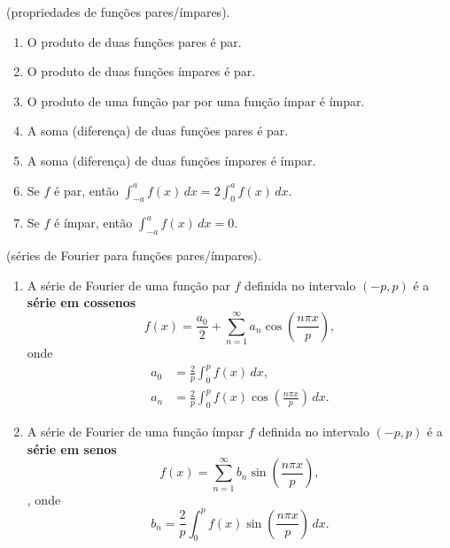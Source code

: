 \documentclass{article}
\begin{document}
\begin{thm} (propriedades de funções pares/ímpares).
    \begin{enumerate}
        \item[\textup{(a)}] O produto de duas funções pares é par.
        \item[\textup{(b)}] O produto de duas funções ímpares é par.
        \item[\textup{(c)}] O produto de uma função par por uma função ímpar é ímpar.
        \item[\textup{(d)}] A soma (diferença) de duas funções pares é par.
        \item[\textup{(e)}] A soma (diferença) de duas funções ímpares é ímpar.
        \item[\textup{(f)}] Se \(f\) é par, então \(\int_{-a}^{a} f(x) \, dx = 2\int_{0}^{a} f(x) \, dx\).
        \item[\textup{(g)}] Se \(f\) é ímpar, então \(\int_{-a}^{a} f(x) \, dx = 0\).
    \end{enumerate}
\end{thm}

\begin{defn} (séries de Fourier para funções pares/ímpares).
    \begin{enumerate}
        \item[(i)] A série de Fourier de uma função par \(f\) definida no intervalo \((-p,p)\) é a \textbf{série em cossenos}
        \begin{equation} \label{eq:fourier-cos}
            f(x) = \frac{a_0}{2} + \sum_{n=1}^{\infty} a_n \cos\left(\frac{n\pi x}{p}\right),
        \end{equation}
        \noindent onde 
        \begin{align}
            a_0 &= \frac{2}{p} \int_{0}^{p} f(x) \, dx, \\
            a_n &= \frac{2}{p} \int_{0}^{p} f(x) \cos\left(\frac{n\pi x}{p}\right) \, dx.
        \end{align}
        \item[(ii)] A série de Fourier de uma função ímpar \(f\) definida no intervalo \((-p,p)\) é a \textbf{série em senos}
        \begin{equation} \label{eq:fourier-sin}
            f(x) = \sum_{n=1}^{\infty} b_n \sin\left(\frac{n\pi x}{p}\right),
        \end{equation},
        \noindent onde
        \begin{equation}
            b_n = \frac{2}{p} \int_{0}^{p} f(x) \sin\left(\frac{n\pi x}{p}\right) \, dx.
        \end{equation}
    \end{enumerate}
\end{defn}
\end{document}
